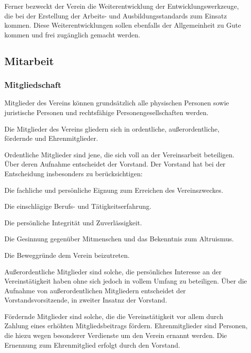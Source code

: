 \documentclass[
ngerman,
paper=a4,
asymmetric,
fontsize=10pt,
draft=false,
numbers=noenddot,
bibtotocnumbered,
footnotes=multiple,
toc=flat,
]{scrbook}
\begin{document}
    Ferner bezweckt der Verein die Weiterentwicklung
    der Entwicklungswerkzeuge, die bei der Erstellung der
    Arbeits- und Ausbildungsstandards zum Einsatz kommen.
    Diese Weiterentwicklungen sollen ebenfalls der
    Allgemeinheit zu Gute kommen und frei zugänglich gemacht
    werden.
        

\subsection{Mitarbeit}

\subsubsection{Mitgliedschaft}
Mitglieder des Vereins können grundsätzlich alle physischen Personen sowie
juristische Personen und rechtsfähige
Personengesellschaften werden.

Die Mitglieder des Vereins gliedern sich in ordentliche,
außerordentliche, fördernde  und Ehrenmitglieder.

Ordentliche Mitglieder sind jene, die sich voll an der Vereinsarbeit
beteiligen. Über deren Aufnahme
entscheidet der Vorstand. Der Vorstand hat bei der Entscheidung insbesonders zu berücksichtigen:
\begin{inparaenum}
  \item Die fachliche und persönliche Eignung zum
  Erreichen des Vereinszweckes.
  \item Die einschlägige Berufs- und
  Tätigkeitserfahrung.
  \item Die persönliche Integrität und
  Zuverlässigkeit.
  \item Die Gesinnung gegenüber Mitmenschen und das
  Bekenntnis zum Altruismus.
  \item Die Beweggründe dem Verein beizutreten.
\end{inparaenum}

Außerordentliche Mitglieder sind solche, die persönliches Interesse an der
Vereinstätigkeit haben ohne sich jedoch in vollem Umfang zu beteiligen. Über die Aufnahme von außerordentlichen Mitgliedern
entscheidet der Vorstandsvorsitzende, in zweiter Insatnz der Vorstand.

Fördernde Mitglieder sind solche, die die
Vereinstätigkeit  vor allem durch Zahlung eines erhöhten Mitgliedsbeitrags
fördern.
Ehrenmitglieder sind Personen, die hiezu wegen besonderer
Verdienste  um den Verein ernannt werden. Die Ernennung zum Ehrenmitglied
erfolgt durch den Vorstand.
\end{document}
